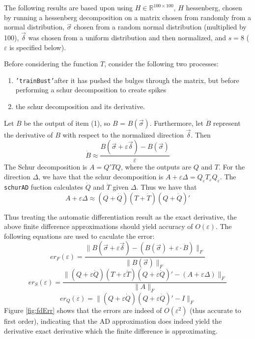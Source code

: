 \documentclass{article}
\newcommand{\tb}{\texttt{'trainBust'}}
\newcommand{\s}{\vec{\sigma}}
\renewcommand{\d}{\vec{\delta}}
\newcommand{\e}{\varepsilon}
\begin{document}
The following results are based upon using $H \in \mathbb{R}^{100\times100}$, $H$ hessenberg,
chosen by running a hessenberg decomposition on a matrix chosen from randomly from a normal distribution,
$\s$ chosen from a random normal distribution (multiplied by 100), $\d$ was chosen
from a uniform distribution and then normalized, and $s = 8$ ($\e$ is specified below).

Before considering the function $T$, consider the following two processes:
\begin{enumerate}
\item \tb after it has pushed the bulges through the matrix, but before performing a schur
decomposition to create spikes
\item the schur decomposition and its derivative.
\end{enumerate}
Let $B$ be the output of item (1), so $B$ = $B(\s)$.
Furthermore, let $\dot{B}$ represent the derivative of $B$ with respect to 
the normalized direction $\d$.
Then
\[
  \dot{B} \approx \dfrac{B(\s + \e\d) - B(\s)}{\e}
\]
The Schur decomposition is $A = Q'TQ$, where the outputs are $Q$ and $T$.
For the direction $\Delta$, we have that the schur decomposition is
$A + \e \Delta = Q_{\e} T_{\e} Q_{\e}$.
The \texttt{schurAD} fuction calculates $\dot{Q}$ and $\dot{T}$ given $\Delta$.
Thus we have that
\[
  A + \e \Delta \approx (Q + \dot{Q}) (T + \dot{T}) (Q + \dot{Q})'
\]

Thus treating the automatic differentiation result as the exact derivative,
the above finite difference approximations should yield accuracy of $O(\e)$.
The following equations are used to caculate the error:
\[
  er_F(\e) = \dfrac{\|B(\s + \e \d) - (B(\s) + \e \cdot \dot{B})\|_F}{\|B(\s)\|_F}
\]
\[
  er_S(\e) = \dfrac{
    \|(Q + \e \dot{Q}) (T + \e \dot{T}) (Q + \e \dot{Q})' - (A + \e \Delta)\|_F}
    {\|A\|_F}
\]
\[
  er_Q(\e) = \| (Q + \e\dot{Q})(Q + \e\dot{Q})' - I\|_F
\]
Figure \ref{fig:fdErr} shows that the errors are indeed of $O(\e^2)$ (thus accurate
to first order), indicating
that the AD approximation does indeed yield the derivative exact derivative which
the finite difference is approximating.
\end{document}
